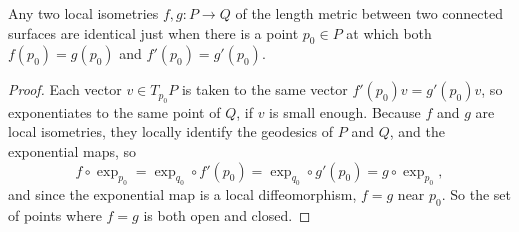 \begin{corollary}
Any two local isometries \(f,g \colon P \to Q\) of the length metric between two connected surfaces are identical just when there is a point \(p_0 \in P\) at which both \(f(p_0)=g(p_0)\) and \(f'(p_0)=g'(p_0)\).
\end{corollary}
\begin{proof}
Each vector \(v \in T_{p_0} P\) is taken to the same vector \(f'(p_0)v=g'(p_0)v\), so exponentiates to the same point of \(Q\), if \(v\) is small enough.
Because \(f\) and \(g\) are local isometries, they locally identify the geodesics of \(P\) and \(Q\), and the exponential maps, so
\[
f \circ \exp_{p_0} = \exp_{q_0} \circ f'(p_0) = \exp_{q_0} \circ g'(p_0) = g \circ \exp_{p_0},
\]
and since the exponential map is a local diffeomorphism, \(f=g\) near \(p_0\).
So the set of points where \(f=g\) is both open and closed.
\end{proof}


